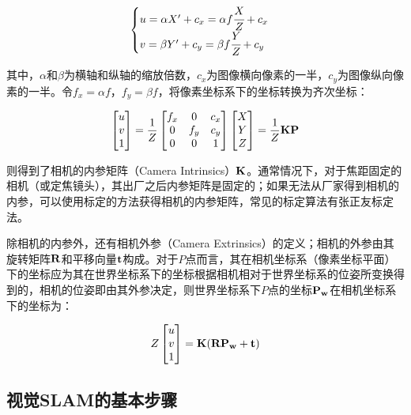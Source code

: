 \begin{equation}
\begin{cases}
u=\alpha X'+c_x=\alpha f \cfrac{X}{Z}+c_x \\
v=\beta Y' +c_y=\beta f  \cfrac{Y}{Z}+c_y \\
\end{cases}
\end{equation}


其中，$\alpha$和$\beta$为横轴和纵轴的缩放倍数，$c_x$为图像横向像素的一半，$c_y$为图像纵向像素的一半。令$f_x=\alpha f$，$f_y=\beta f$，将像素坐标系下的坐标转换为齐次坐标：

\begin{equation}
\begin{bmatrix}
u\\v\\1
\end{bmatrix}=
\frac{1}{Z}
\begin{bmatrix}
f_x & 0 & c_x\\
0   & f_y & c_y\\
0 & 0 & 1
\end{bmatrix}
\begin{bmatrix}
X\\Y\\Z
\end{bmatrix}=
\frac{1}{Z} \bf{KP}
\end{equation}


则得到了相机的内参矩阵（Camera Intrinsics）$\bf{K}$。通常情况下，对于焦距固定的相机（或定焦镜头），其出厂之后内参矩阵是固定的；如果无法从厂家得到相机的内参，可以使用标定的方法获得相机的内参矩阵，常见的标定算法有张正友标定法\cite{Gao2017SLAM}。

除相机的内参外，还有相机外参（Camera Extrinsics）的定义；相机的外参由其旋转矩阵$\bf{R}$和平移向量$\bf{t}$构成。对于$P$点而言，其在相机坐标系（像素坐标平面）下的坐标应为其在世界坐标系下的坐标根据相机相对于世界坐标系的位姿所变换得到的，相机的位姿即由其外参决定，则世界坐标系下$P$点的坐标$\bf{P_w}$在相机坐标系下的坐标为：


\begin{equation}
Z
\begin{bmatrix}
u\\v\\1
\end{bmatrix}=
\bf{K(RP_w+t)}
\end{equation}

\subsection{视觉SLAM的基本步骤} \label{3.1.3}

